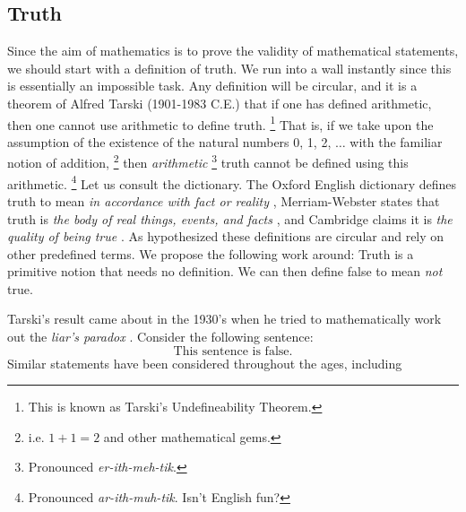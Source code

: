     \subsection{Truth}
        Since the aim of mathematics is to prove the validity of mathematical
        statements, we should start with a definition of truth. We run into a
        wall instantly since this is essentially an impossible task. Any
        definition will be circular, and it is a theorem of
        Alfred Tarski (1901-1983 C.E.) that if one has
        defined arithmetic, then one cannot use arithmetic to define
        truth.%
        \footnote{%
            This is known as Tarski's Undefineability Theorem.%
        }
        That is, if we take upon the assumption of the existence of the
        natural numbers 0, 1, 2, $\dots$ with the familiar notion of addition,%
        \footnote{%
            i.e. $1+1=2$ and other mathematical gems.
        }
        then \textit{arithmetic}%
        \footnote{%
            Pronounced \textit{er-ith-meh-tik}.
        }
        truth cannot be defined using this arithmetic.%
        \footnote{%
            Pronounced \textit{ar-ith-muh-tik}. Isn't English fun?
        }
        Let us consult the dictionary. The Oxford English dictionary defines
        truth to mean \textit{in accordance with fact or reality}
        \cite{OEDTrueDef}, Merriam-Webster states that truth is
        \textit{the body of real things, events, and facts}
        \cite{MerriamWebsterTruthDef}, and Cambridge claims it is
        \textit{the quality of being true} \cite{CambridgeTruthDef}. As
        hypothesized these definitions are circular and rely on other predefined
        terms. We propose the following work around: Truth is a
        primitive notion that needs no definition. We can then define
        false to mean \textit{not} true.
        \par\hfill\par
        Tarski's result came about in the 1930's when he tried to mathematically
        work out the \textit{liar's paradox}%
         \cite{TarskiUndefinability}. Consider the
        following sentence:
        \begin{equation}
            \text{This sentence is false.}
        \end{equation}
        Similar statements have been considered throughout the ages, including

